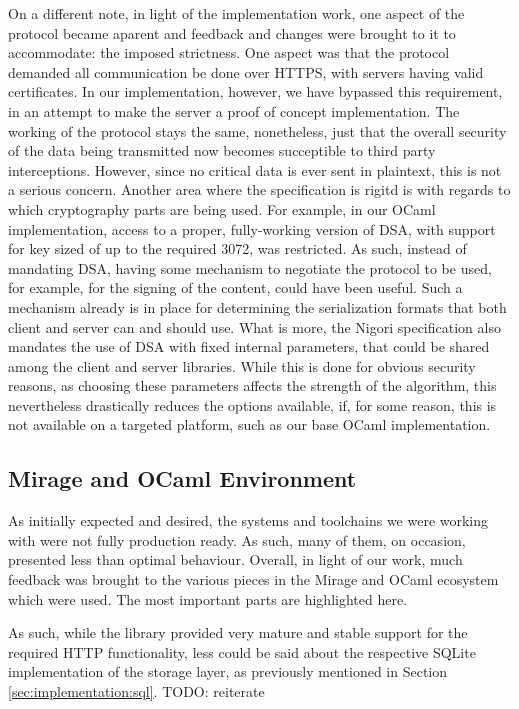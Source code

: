 On a different note, in light of the implementation work, one aspect of the protocol became aparent and feedback and changes were brought to it to accommodate: the imposed strictness.
One aspect was that the protocol demanded all communication be done over HTTPS, with servers having valid certificates.
In our implementation, however, we have bypassed this requirement, in an attempt to make the server a proof of concept implementation.
The working of the protocol stays the same, nonetheless, just that the overall security of the data being transmitted now becomes succeptible to third party interceptions.
However, since no critical data is ever sent in plaintext, this is not a serious concern.
Another area where the specification is rigitd is with regards to which cryptography parts are being used.
For example, in our OCaml implementation, access to a proper, fully-working version of DSA, with support for key sized of up to the required 3072, was restricted.
As such, instead of mandating DSA, having some mechanism to negotiate the protocol to be used, for example, for the signing of the content, could have been useful.
Such a mechanism already is in place for determining the serialization formats that both client and server can and should use.
What is more, the Nigori specification also mandates the use of DSA with fixed internal parameters, that could be shared among the client and server libraries.
While this is done for obvious security reasons, as choosing these parameters affects the strength of the algorithm, this nevertheless drastically reduces the options available, if, for some reason, this is not available on a targeted platform, such as our base OCaml implementation.

\subsection{Mirage and OCaml Environment}
As initially expected and desired, the systems and toolchains we were working with were not fully production ready.
As such, many of them, on occasion, presented less than optimal behaviour.
Overall, in light of our work, much feedback was brought to the various pieces in the Mirage and OCaml ecosystem which were used.
The most important parts are highlighted here.

As such, while the  library provided very mature and stable support for the required HTTP functionality, less could be said about the respective SQLite implementation of the storage layer, as previously mentioned in Section \ref{sec:implementation:sql}. TODO: reiterate

